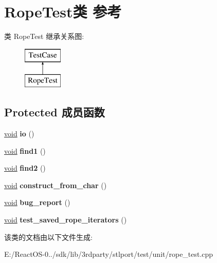 \hypertarget{class_rope_test}{}\section{Rope\+Test类 参考}
\label{class_rope_test}
类 Rope\+Test 继承关系图\+:\begin{figure}[H]
\begin{center}
\leavevmode
\includegraphics[height=2.000000cm]{class_rope_test}
\end{center}
\end{figure}
\subsection*{Protected 成员函数}
\begin{DoxyCompactItemize}
\item 
\mbox{\label{class_rope_test_aef36bce66db0cce971913f17e6914db3}} 
\hyperlink{interfacevoid}{void} {\bfseries io} ()
\item 
\mbox{\label{class_rope_test_a1ed517dea0b93adbaa4875180f1bf2a9}} 
\hyperlink{interfacevoid}{void} {\bfseries find1} ()
\item 
\mbox{\label{class_rope_test_a41c670f577aaf47fda443c5eb9687131}} 
\hyperlink{interfacevoid}{void} {\bfseries find2} ()
\item 
\mbox{\label{class_rope_test_a83e5e11b429dedb3c6379703dedc11bf}} 
\hyperlink{interfacevoid}{void} {\bfseries construct\+\_\+from\+\_\+char} ()
\item 
\mbox{\label{class_rope_test_a77977ee045d149c23dc5796b9767c9d8}} 
\hyperlink{interfacevoid}{void} {\bfseries bug\+\_\+report} ()
\item 
\mbox{\label{class_rope_test_acd09270f1ce45f69757a12c5516bb7aa}} 
\hyperlink{interfacevoid}{void} {\bfseries test\+\_\+saved\+\_\+rope\+\_\+iterators} ()
\end{DoxyCompactItemize}


该类的文档由以下文件生成\+:\begin{DoxyCompactItemize}
\item 
E\+:/\+React\+O\+S-\/0../sdk/lib/3rdparty/stlport/test/unit/rope\+\_\+test.\+cpp\end{DoxyCompactItemize}
